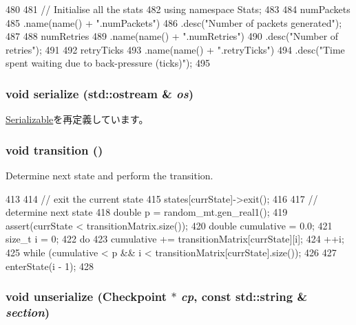 \begin{DoxyCode}
480 {
481     // Initialise all the stats
482     using namespace Stats;
483 
484     numPackets
485         .name(name() + ".numPackets")
486         .desc("Number of packets generated");
487 
488     numRetries
489         .name(name() + ".numRetries")
490         .desc("Number of retries");
491 
492     retryTicks
493         .name(name() + ".retryTicks")
494         .desc("Time spent waiting due to back-pressure (ticks)");
495 }
\end{DoxyCode}
\hypertarget{classTrafficGen_a53e036786d17361be4c7320d39c99b84}{
\subsubsection[{serialize}]{\setlength{\rightskip}{0pt plus 5cm}void serialize (std::ostream \& {\em os})}}
\label{classTrafficGen_a53e036786d17361be4c7320d39c99b84}


\hyperlink{classSerializable_ad6272f80ae37e8331e3969b3f072a801}{Serializable}を再定義しています。\hypertarget{classTrafficGen_aab0a81b788e7282586c12953fa5e0c37}{
\subsubsection[{transition}]{\setlength{\rightskip}{0pt plus 5cm}void transition ()}}
\label{classTrafficGen_aab0a81b788e7282586c12953fa5e0c37}
Determine next state and perform the transition. 


\begin{DoxyCode}
413 {
414     // exit the current state
415     states[currState]->exit();
416 
417     // determine next state
418     double p = random_mt.gen_real1();
419     assert(currState < transitionMatrix.size());
420     double cumulative = 0.0;
421     size_t i = 0;
422     do {
423         cumulative += transitionMatrix[currState][i];
424         ++i;
425     } while (cumulative < p && i < transitionMatrix[currState].size());
426 
427     enterState(i - 1);
428 }
\end{DoxyCode}
\hypertarget{classTrafficGen_af22e5d6d660b97db37003ac61ac4ee49}{
\subsubsection[{unserialize}]{\setlength{\rightskip}{0pt plus 5cm}void unserialize ({\bf Checkpoint} $\ast$ {\em cp}, \/  const std::string \& {\em section})}}
\label{classTrafficGen_af22e5d6d660b97db37003ac61ac4ee49}


